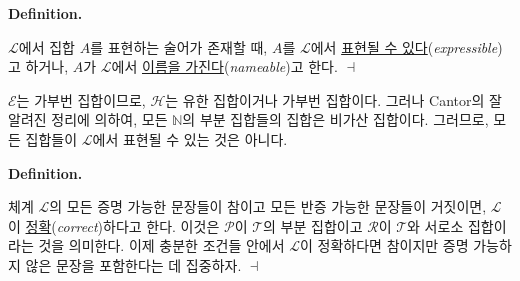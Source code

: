 \documentclass[12pt]{paper}
\newenvironment{context}[1][]
{ \noindent \textbf{{#1}.}
}
{ \hfill $ \dashv $
}
\begin{document}
  \begin{context}[Definition]
    $\mathcal{L}$에서 집합 $A$를 표현하는 술어가 존재할 때,
    $A$를 $\mathcal{L}$에서 \underline{표현될 수 있다}(\textit{expressible})고 하거나,
    $A$가 $\mathcal{L}$에서 \underline{이름을 가진다}(\textit{nameable})고 한다.
  \end{context}

  $\mathcal{E}$는 가부번 집합이므로,
  $\mathcal{H}$는 유한 집합이거나 가부번 집합이다.
  그러나 Cantor의 잘 알려진 정리에 의하여,
  모든 $\mathbb{N}$의 부분 집합들의 집합은 비가산 집합이다.
  그러므로, 모든 집합들이 $\mathcal{L}$에서 표현될 수 있는 것은 아니다.
  
  \begin{context}[Definition]
    체계 $\mathcal{L}$의 모든 증명 가능한 문장들이 참이고 모든 반증 가능한 문장들이 거짓이면,
    $\mathcal{L}$이 \underline{정확}(\textit{correct})하다고 한다.
    이것은 $\mathcal{P}$이 $\mathcal{T}$의 부분 집합이고 $\mathcal{R}$이 $\mathcal{T}$와 서로소 집합이라는 것을 의미한다.
    이제 충분한 조건들 안에서 $\mathcal{L}$이 정확하다면 참이지만 증명 가능하지 않은 문장을 포함한다는 데 집중하자.
  \end{context}
\end{document}
